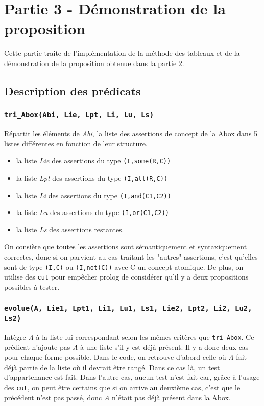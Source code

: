 \documentclass{article}
\newcommand{\code}[1]{\colorbox{light-gray}{\texttt{#1}}}
\begin{document}
\clearpage

\section{Partie 3 - Démonstration de la proposition}
Cette partie traite de l'implémentation de la méthode des tableaux et de la démonstration de la proposition obtenue dans la partie 2.

\subsection{Description des prédicats}

\subsubsection{\code{tri\_Abox(Abi, Lie, Lpt, Li, Lu, Ls)}}

Répartit les éléments de \textit{Abi}, la liste des assertions de concept de la Abox dans 5 listes différentes en fonction de leur structure. 
\begin{itemize}
    \item la liste \textit{Lie} des assertions du type \code{(I,some(R,C))}
    \item la liste \textit{Lpt} des assertions du type \code{(I,all(R,C))}
    \item la liste \textit{Li} des assertions du type \code{(I,and(C1,C2))}
    \item la liste \textit{Lu} des assertions du type \code{(I,or(C1,C2))}
    \item la liste \textit{Ls} des assertions restantes.
\end{itemize}
 On consière que toutes les assertions sont sémantiquement et syntaxiquement correctes, donc si on parvient au cas traitant les "autres" assertions, c'est qu'elles sont de type \code{(I,C)} ou \code{(I,not(C))} avec C un concept atomique. De plus, on utilise des \code{cut} pour empêcher prolog de considérer qu'il y a deux propositions possibles à tester.

\subsubsection{\code{evolue(A, Lie1, Lpt1, Li1, Lu1, Ls1, Lie2, Lpt2, Li2, Lu2, Ls2)}}

Intègre \textit{A} à la liste lui correspondant selon les mêmes critères que \code{tri\_Abox}. Ce prédicat n'ajoute pas \textit{A} à une liste s'il y est déjà présent. Il y a donc deux cas pour chaque forme possible. Dans le code, on retrouve d'abord celle où \textit{A} fait déjà partie de la liste où il devrait être rangé. Dans ce  cas là, un test d'appartenance est fait. Dans l'autre cas, aucun test n'est fait car, grâce à l'usage des \code{cut}, on peut être certains que si on arrive au deuxième cas, c'est que le précédent n'est pas passé, donc \textit{A} n'était pas déjà présent dans la Abox.
 
\end{document}
